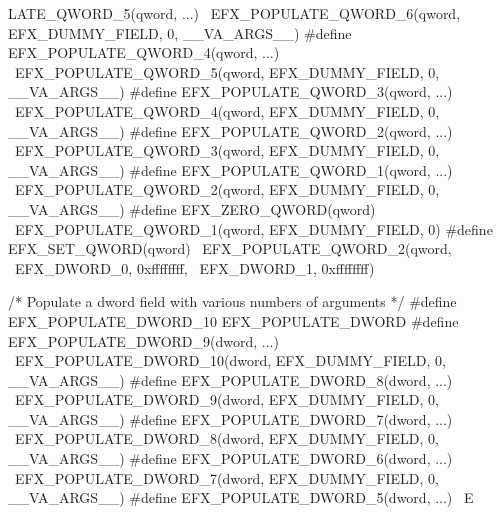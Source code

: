 LATE_QWORD_5(qword, ...) \
	EFX_POPULATE_QWORD_6(qword, EFX_DUMMY_FIELD, 0, __VA_ARGS__)
#define EFX_POPULATE_QWORD_4(qword, ...) \
	EFX_POPULATE_QWORD_5(qword, EFX_DUMMY_FIELD, 0, __VA_ARGS__)
#define EFX_POPULATE_QWORD_3(qword, ...) \
	EFX_POPULATE_QWORD_4(qword, EFX_DUMMY_FIELD, 0, __VA_ARGS__)
#define EFX_POPULATE_QWORD_2(qword, ...) \
	EFX_POPULATE_QWORD_3(qword, EFX_DUMMY_FIELD, 0, __VA_ARGS__)
#define EFX_POPULATE_QWORD_1(qword, ...) \
	EFX_POPULATE_QWORD_2(qword, EFX_DUMMY_FIELD, 0, __VA_ARGS__)
#define EFX_ZERO_QWORD(qword) \
	EFX_POPULATE_QWORD_1(qword, EFX_DUMMY_FIELD, 0)
#define EFX_SET_QWORD(qword) \
	EFX_POPULATE_QWORD_2(qword, \
			     EFX_DWORD_0, 0xffffffff, \
			     EFX_DWORD_1, 0xffffffff)

/* Populate a dword field with various numbers of arguments */
#define EFX_POPULATE_DWORD_10 EFX_POPULATE_DWORD
#define EFX_POPULATE_DWORD_9(dword, ...) \
	EFX_POPULATE_DWORD_10(dword, EFX_DUMMY_FIELD, 0, __VA_ARGS__)
#define EFX_POPULATE_DWORD_8(dword, ...) \
	EFX_POPULATE_DWORD_9(dword, EFX_DUMMY_FIELD, 0, __VA_ARGS__)
#define EFX_POPULATE_DWORD_7(dword, ...) \
	EFX_POPULATE_DWORD_8(dword, EFX_DUMMY_FIELD, 0, __VA_ARGS__)
#define EFX_POPULATE_DWORD_6(dword, ...) \
	EFX_POPULATE_DWORD_7(dword, EFX_DUMMY_FIELD, 0, __VA_ARGS__)
#define EFX_POPULATE_DWORD_5(dword, ...) \
	E